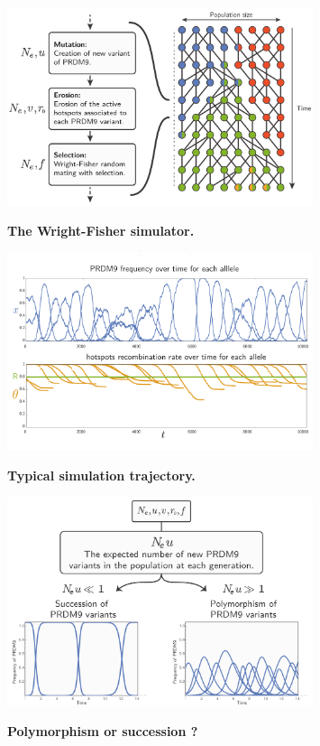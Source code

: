 \documentclass{article}
\begin{document}
\begin{figure}[!ht]
	  \centering
       \includegraphics[width=0.8\textwidth]{Images/wright-fisher.pdf}\\
		\caption{ \textbf{ The Wright-Fisher simulator.} 
}
\end{figure}

\begin{figure}[!ht]
	  \centering
       \includegraphics[width=0.8\textwidth]{Images/simulated-trajectory.pdf}\\
		\caption{ \textbf{ Typical simulation trajectory.} 
}
\end{figure}

\begin{figure}[!ht]
	  \centering
       \includegraphics[width=0.8\textwidth]{Images/polymorphism.pdf}\\
		\caption{ \textbf{ Polymorphism or succession ?} 
}
\end{figure}
\end{document}
